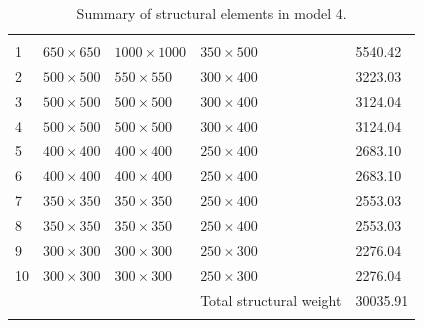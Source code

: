 \documentclass{cup-pan}
\begin{document}
\renewcommand{\arraystretch}{1}
\begin{longtable}{P{0.5in} P{1in} P{1in} P{1in} P{1in}}
\caption{Summary of structural elements in model 4.}\\
\headrow {} &  &  &  &  \\
1 & $650 \times 650$ & $1000 \times 1000$ & $350 \times 500$ & \num{5540.42} \\
2 & $500 \times 500$ & $550 \times 550$ & $300 \times 400$ & \num{3223.03} \\
3 & $500 \times 500$ & $500 \times 500$ & $300 \times 400$ & \num{3124.04} \\
4 & $500 \times 500$ & $500 \times 500$ & $300 \times 400$ & \num{3124.04} \\
5 & $400 \times 400$ & $400 \times 400$ & $250 \times 400$ & \num{2683.10} \\
6 & $400 \times 400$ & $400 \times 400$ & $250 \times 400$ & \num{2683.10} \\
7 & $350 \times 350$ & $350 \times 350$ & $250 \times 400$ & \num{2553.03} \\
8 & $350 \times 350$ & $350 \times 350$ & $250 \times 400$ & \num{2553.03} \\
9 & $300 \times 300$ & $300 \times 300$ & $250 \times 300$ & \num{2276.04} \\
10 & $300 \times 300$ & $300 \times 300$ & $250 \times 300$ & \num{2276.04} \\
 &  & & Total structural weight & \num{30035.91} \\
\label{tab:cross section model 4}
\end{longtable}
\end{document}
